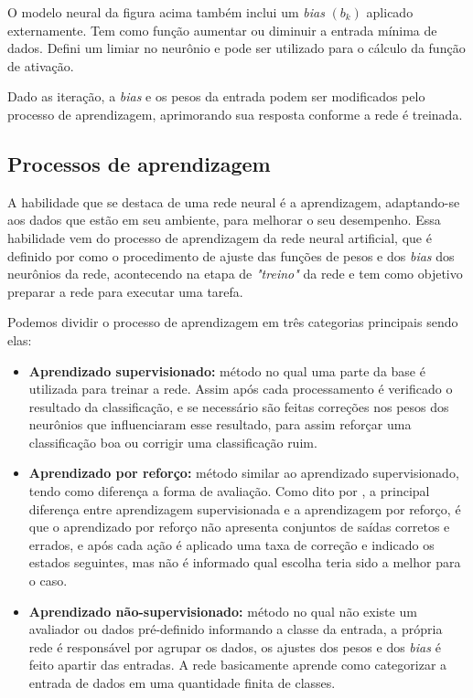 \par O modelo neural da figura acima também inclui um \textit{bias} $(b_k)$ aplicado externamente. Tem como função aumentar ou diminuir a entrada mínima de dados. Defini um limiar no neurônio e pode ser utilizado para o cálculo da função de ativação. 
\par Dado as iteração, a \textit{bias} e os pesos da entrada podem ser modificados pelo processo de aprendizagem, aprimorando sua resposta conforme a rede é treinada.  
\subsection{Processos de aprendizagem}
A habilidade que se destaca de uma rede neural é a aprendizagem, adaptando-se aos dados que estão em seu ambiente, para melhorar o seu desempenho. Essa habilidade vem do processo de aprendizagem da rede neural artificial, que é definido por  como o procedimento de ajuste das funções de pesos e dos \textit{bias} dos neurônios da rede, acontecendo na etapa de \textit{"treino"} da rede e tem como objetivo preparar a rede para executar uma tarefa. 
\par Podemos dividir o processo de aprendizagem em três categorias principais sendo elas:
\begin{itemize}
\item \textbf{Aprendizado supervisionado:} método no qual uma parte da base é utilizada para treinar a rede. Assim após cada processamento é verificado o resultado da classificação, e se necessário são feitas correções nos pesos dos neurônios que influenciaram esse resultado, para assim reforçar uma classificação boa ou corrigir uma classificação ruim.
\item \textbf{Aprendizado por reforço:} método similar ao aprendizado supervisionado, tendo como diferença a forma de avaliação. Como dito por , a principal diferença entre aprendizagem supervisionada e a aprendizagem por reforço, é que o aprendizado por reforço não apresenta conjuntos de saídas corretos e errados, e após cada ação é aplicado uma taxa de correção e indicado os estados seguintes, mas não é informado qual escolha teria sido a melhor para o caso.
\item \textbf{Aprendizado não-supervisionado:} método no qual não existe um avaliador ou dados pré-definido informando a classe da entrada, a própria rede é responsável por agrupar os dados, os ajustes dos pesos e dos \textit{bias} é feito apartir das entradas. A rede basicamente aprende como categorizar a entrada de dados em uma quantidade finita de classes. 
\end{itemize}	
